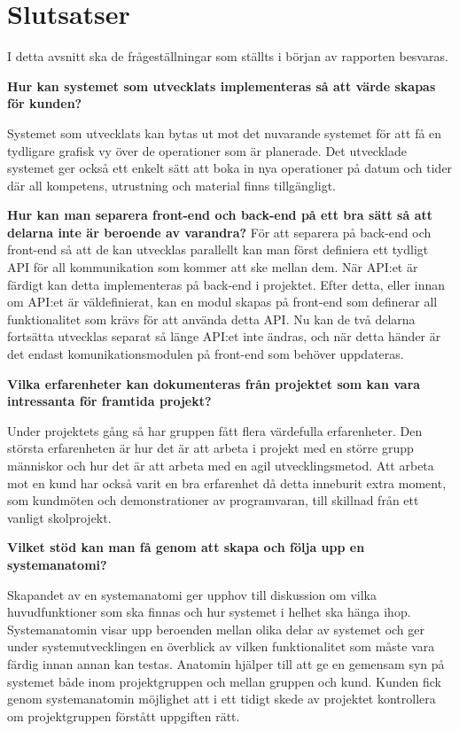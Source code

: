 \chapter{Slutsatser}
I detta avsnitt ska de frågeställningar som ställts i början av rapporten besvaras.

\textbf{Hur kan systemet som utvecklats implementeras så att värde skapas för kunden?}

Systemet som utvecklats kan bytas ut mot det nuvarande systemet för att få en tydligare grafisk vy över de operationer som är planerade. Det utvecklade systemet ger också ett enkelt sätt att boka in nya operationer på datum och tider där all kompetens, utrustning och material finns tillgängligt.

\textbf{Hur kan man separera front-end och back-end på ett bra sätt så att delarna inte är beroende av varandra?}
För att separera på back-end och front-end så att de kan utvecklas parallellt kan man först definiera ett tydligt API för all kommunikation som kommer att ske mellan dem. När API:et är färdigt kan detta implementeras på back-end i projektet. Efter detta, eller innan om API:et är väldefinierat, kan en modul skapas på front-end som definerar all funktionalitet som krävs för att använda detta API. Nu kan de två delarna fortsätta utvecklas separat så länge API:et inte ändras, och när detta händer är det endast komunikationsmodulen på front-end som behöver uppdateras.

\textbf{Vilka erfarenheter kan dokumenteras från projektet som kan vara intressanta för framtida projekt?}

Under projektets gång så har gruppen fått flera värdefulla erfarenheter. Den största erfarenheten är hur det är att arbeta i projekt med en större grupp människor och hur det är att arbeta med en agil utvecklingsmetod. Att arbeta mot en kund har också varit en bra erfarenhet då detta inneburit extra moment, som kundmöten och demonstrationer av programvaran, till skillnad från ett vanligt skolprojekt.

\textbf{Vilket stöd kan man få genom att skapa och följa upp en systemanatomi?}

Skapandet av en systemanatomi ger upphov till diskussion om vilka huvudfunktioner som ska finnas och hur systemet i helhet ska hänga ihop. Systemanatomin visar upp beroenden mellan olika delar av systemet och ger under systemutvecklingen en överblick av vilken funktionalitet som måste vara färdig innan annan kan testas. Anatomin hjälper till att ge en gemensam syn på systemet både inom projektgruppen och mellan gruppen och kund. Kunden fick genom systemanatomin möjlighet att i ett tidigt skede av projektet kontrollera om projektgruppen förstått uppgiften rätt.    
